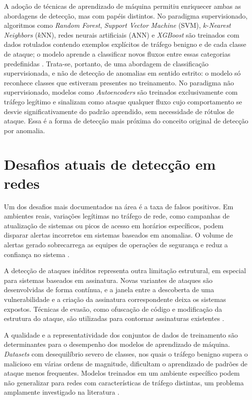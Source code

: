 A adoção de técnicas de aprendizado de máquina permitiu enriquecer ambas as abordagens de detecção, mas com papéis distintos. No paradigma supervisionado, algoritmos como \textit{Random Forest}, \textit{Support Vector Machine} (SVM), $k$-\textit{Nearest Neighbors} ($k$NN), redes neurais artificiais (ANN) e \textit{XGBoost} são treinados com dados rotulados contendo exemplos explícitos de tráfego benigno e de cada classe de ataque; o modelo aprende a classificar novos fluxos entre essas categorias predefinidas \cite{santos2023ercemapi}. Trata-se, portanto, de uma abordagem de classificação supervisionada, e não de detecção de anomalias em sentido estrito: o modelo só reconhece classes que estiveram presentes no treinamento. No paradigma não supervisionado, modelos como \textit{Autoencoders} são treinados exclusivamente com tráfego legítimo e sinalizam como ataque qualquer fluxo cujo comportamento se desvie significativamente do padrão aprendido, sem necessidade de rótulos de ataque. Essa é a forma de detecção mais próxima do conceito original de detecção por anomalia.

\section{Desafios atuais de detecção em redes}

Um dos desafios mais documentados na área é a taxa de falsos positivos. Em ambientes reais, variações legítimas no tráfego de rede, como campanhas de atualização de sistemas ou picos de acesso em horários específicos, podem disparar alertas incorretos em sistemas baseados em anomalias. O volume de alertas gerado sobrecarrega as equipes de operações de segurança e reduz a confiança no sistema \cite{santos2023ercemapi}.

A detecção de ataques inéditos representa outra limitação estrutural, em especial para sistemas baseados em assinatura. Novas variantes de ataques são desenvolvidas de forma contínua, e a janela entre a descoberta de uma vulnerabilidade e a criação da assinatura correspondente deixa os sistemas expostos. Técnicas de evasão, como ofuscação de código e modificação da estrutura do ataque, são utilizadas para contornar assinaturas existentes \cite{ravindran2025}.

A qualidade e a representatividade dos conjuntos de dados de treinamento são determinantes para o desempenho dos modelos de aprendizado de máquina. \textit{Datasets} com desequilíbrio severo de classes, nos quais o tráfego benigno supera o malicioso em várias ordens de magnitude, dificultam o aprendizado de padrões de ataque menos frequentes. Modelos treinados em um ambiente específico podem não generalizar para redes com características de tráfego distintas, um problema amplamente investigado na literatura \cite{neto_gomes}.
